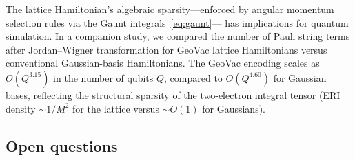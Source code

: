 \documentclass[aps,pra,twocolumn,superscriptaddress,longbibliography]{revtex4-2}
\begin{document}
The lattice Hamiltonian's algebraic sparsity---enforced by angular
momentum selection rules via the Gaunt integrals~\eqref{eq:gaunt}---
has implications for quantum simulation.  In a companion study, we
compared the number of Pauli string terms after Jordan--Wigner
transformation for GeoVac lattice Hamiltonians versus conventional
Gaussian-basis Hamiltonians.  The GeoVac encoding scales as
$O(Q^{3.15})$ in the number of qubits $Q$, compared to
$O(Q^{4.60})$ for Gaussian bases, reflecting the structural sparsity
of the two-electron integral tensor (ERI density $\sim 1/M^2$
for the lattice versus $\sim O(1)$ for Gaussians).

\subsection{Open questions}
\end{document}
